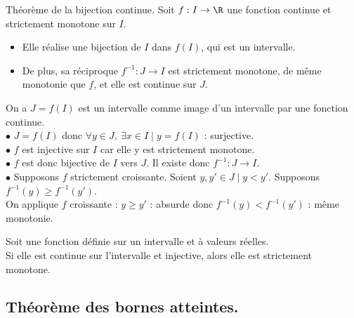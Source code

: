 \documentclass[11pt]{article}
\begin{document}
\begin{thm}{Théorème de la bijection continue.}{}
    Soit $f:I\to\R$ une fonction continue et strictement monotone sur $I$.
    \begin{itemize}
        \item Elle réalise une bijection de $I$ dans $f(I)$, qui est un intervalle.
        \item De plus, sa réciproque $f^{-1}:J\to I$ est strictement monotone, de même monotonie que $f$, et elle est continue sur $J$.
    \end{itemize}
    \tcblower
    On a $J=f(I)$ est un intervalle comme image d'un intervalle par une fonction continue.\\
    $\bullet$ $J=f(I)$ donc $\forall y \in J, ~ \exists x \in I \mid y = f(I)$ : surjective.\\
    $\bullet$ $f$ est injective sur $I$ car elle y est strictement monotone.\\
    $\bullet$ $f$ est donc bijective de $I$ vers $J$. Il existe donc $f^{-1}:J\to I$.\\
    $\bullet$ Supposons $f$ strictement croissante. Soient $y,y'\in J \mid y<y'$. Supposons $f^{-1}(y)\geq f^{-1}(y')$.\\
    On applique $f$ croissante : $y\geq y'$ : absurde donc $f^{-1}(y)<f^{-1}(y')$ : même monotonie.
\end{thm}

\begin{prop}{}{}
    Soit une fonction définie sur un intervalle et à valeurs réelles.\\
    Si elle est continue sur l'intervalle et injective, alors elle est strictement monotone.
\end{prop}

\subsection{Théorème des bornes atteintes.}
\end{document}
